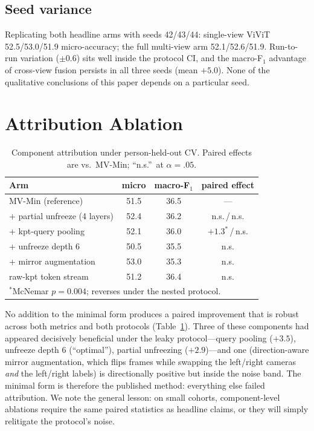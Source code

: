 \documentclass[journal]{IEEEtran}
\newcommand{\micro}{micro-accuracy}
\newcommand{\mF}{macro-F$_1$}
\newcommand{\mvmin}{MV-Min}
\begin{document}
\subsection{Seed variance}
Replicating both headline arms with seeds 42/43/44: single-view ViViT
52.5/53.0/51.9 \micro; the full multi-view arm 52.1/52.6/51.9.  Run-to-run
variation ($\pm0.6$) sits well inside the protocol CI, and the \mF{}
advantage of cross-view fusion persists in all three seeds (mean $+5.0$).
None of the qualitative conclusions of this paper depends on a particular
seed.

\section{Attribution Ablation}
\label{sec:ablation}
\begin{table}[t]
\caption{Component attribution under person-held-out CV.  Paired effects
are vs.\ \mvmin{}; ``n.s.''\ at $\alpha{=}.05$.}
\label{tab:ablation}
\centering\footnotesize\setlength{\tabcolsep}{4pt}
\begin{tabular}{lccc}
\toprule
Arm & micro & \mF & paired effect \\
\midrule
\mvmin{} (reference)         & 51.5 & 36.5 & --- \\
\;+ partial unfreeze (4 layers)& 52.4 & 36.2 & n.s.\,/\,n.s. \\
\;+ kpt-query pooling        & 52.1 & 36.0 & $+1.3^{*}$\,/\,n.s. \\
\;+ unfreeze depth 6         & 50.5 & 35.5 & n.s. \\
\;+ mirror augmentation      & 53.0 & 35.3 & n.s. \\
\;raw-kpt token stream       & 51.2 & 36.4 & n.s. \\
\bottomrule
\multicolumn{4}{l}{\footnotesize $^{*}$McNemar $p{=}0.004$; reverses under
the nested protocol.}
\end{tabular}
\end{table}
No addition to the minimal form produces a paired improvement that is robust
across both metrics and both protocols (Table~\ref{tab:ablation}).  Three of
these components had appeared decisively beneficial under the leaky
protocol---query pooling ($+3.5$), unfreeze depth 6 (``optimal''), partial
unfreezing ($+2.9$)---and one (direction-aware mirror augmentation, which
flips frames while swapping the left/right cameras \emph{and} the
left/right labels) is directionally positive but inside the noise band.
The minimal form is therefore the published method: everything else failed
attribution.  We note the general lesson: on small cohorts, component-level
ablations require the same paired statistics as headline claims, or they
will simply relitigate the protocol's noise.
\end{document}
